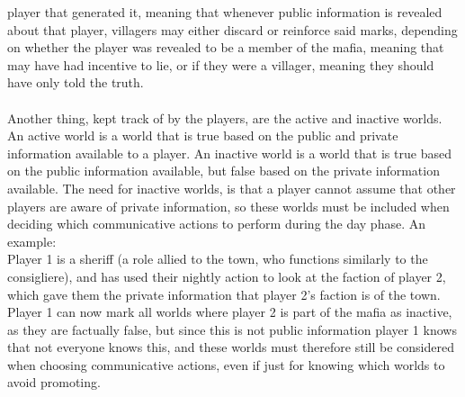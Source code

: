 player that generated it, meaning that whenever public information is revealed
about that player, villagers may either discard or reinforce said marks,
depending on whether the player was revealed to be a member of the mafia,
meaning that may have had incentive to lie, or if they were a villager, meaning
they should have only told the truth. \\ \\
Another thing, kept track of by the
players, are the active and inactive worlds. An active world is a world that is
true based on the public and private information available to a player. An
inactive world is a world that is true based on the public information
available, but false based on the private information available. The need for
inactive worlds, is that a player cannot assume that other players are aware of
private information, so these worlds must be included when deciding which
communicative actions to perform during the day phase. An example: \\
Player 1 is
a sheriff (a role allied to the town, who functions similarly to the 
consigliere), and has used their nightly action to look at the faction of 
player 2,
which gave them the private information that player 2's faction is of the town.
Player 1 can now mark all worlds where player 2 is part of the mafia as
inactive, as they are factually false, but since this is not public information
player 1 knows that not everyone knows this, and these worlds must therefore
still be considered when choosing communicative actions, even if just for
knowing which worlds to avoid promoting.
